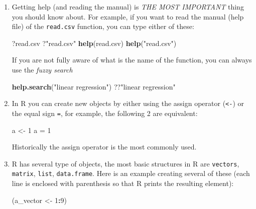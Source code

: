 \documentclass[]{book}
\newenvironment{Shaded}{\begin{snugshade}}{\end{snugshade}}
\newcommand{\DecValTok}[1]{\textcolor[rgb]{0.00,0.00,0.81}{#1}}
\newcommand{\KeywordTok}[1]{\textcolor[rgb]{0.13,0.29,0.53}{\textbf{#1}}}
\newcommand{\NormalTok}[1]{#1}
\newcommand{\OperatorTok}[1]{\textcolor[rgb]{0.81,0.36,0.00}{\textbf{#1}}}
\newcommand{\StringTok}[1]{\textcolor[rgb]{0.31,0.60,0.02}{#1}}
\begin{document}
\begin{enumerate}
\def\labelenumi{\arabic{enumi}.}
\setcounter{enumi}{-1}
\item
  Getting help (and reading the manual) is \emph{THE MOST IMPORTANT} thing you should know about. For example, if you want to read the manual (help file) of the \texttt{read.csv} function, you can type either of these:

\begin{Shaded}
\begin{Highlighting}[]
\NormalTok{?read.csv}
\NormalTok{?}\StringTok{"read.csv"}
\KeywordTok{help}\NormalTok{(read.csv)}
\KeywordTok{help}\NormalTok{(}\StringTok{"read.csv"}\NormalTok{)}
\end{Highlighting}
\end{Shaded}

  If you are not fully aware of what is the name of the function, you can always use the \emph{fuzzy search}

\begin{Shaded}
\begin{Highlighting}[]
\KeywordTok{help.search}\NormalTok{(}\StringTok{"linear regression"}\NormalTok{)}
\NormalTok{??}\StringTok{"linear regression"}
\end{Highlighting}
\end{Shaded}
\item
  In R you can create new objects by either using the assign operator (\texttt{\textless{}-}) or the equal sign \texttt{=}, for example, the following 2 are equivalent:

\begin{Shaded}
\begin{Highlighting}[]
\NormalTok{a <-}\StringTok{ }\DecValTok{1}
\NormalTok{a =}\StringTok{  }\DecValTok{1}
\end{Highlighting}
\end{Shaded}

  Historically the assign operator is the most commonly used.
\item
  R has several type of objects, the most basic structures in R are \texttt{vectors}, \texttt{matrix}, \texttt{list}, \texttt{data.frame}. Here is an example creating several of these (each line is enclosed with parenthesis so that R prints the resulting element):

\begin{Shaded}
\begin{Highlighting}[]
\NormalTok{(a_vector     <-}\StringTok{ }\DecValTok{1}\OperatorTok{:}\DecValTok{9}\NormalTok{)}
\end{Highlighting}
\end{Shaded}


\end{enumerate}
\end{document}

